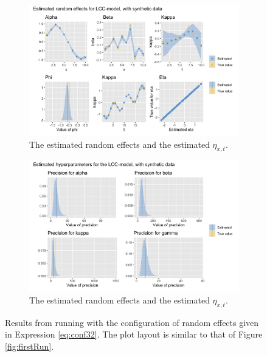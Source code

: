 \begin{figure}[h!]
    \centering
    \begin{subfigure}[b]{0.85\textwidth}
        \centering
        \includegraphics[width=\textwidth]{synthetic-data/Figures/effects-LCC-synthetic-3-2.png}
        \caption{The estimated random effects and the estimated $\eta_{x,t}$.}
    \end{subfigure}
    
    \begin{subfigure}[b]{0.6\textwidth}
        \centering
        \includegraphics[width=\textwidth]{synthetic-data/Figures/hyperparameters-LCC-synthetic-3-2.png}
        \caption{The estimated random effects and the estimated $\eta_{x,t}$.}
    \end{subfigure}
    \caption{Results from running \inlabru with the configuration of random effects given in Expression \ref{eq:conf32}. The plot layout is similar to that of Figure \ref{fig:firstRun}.}
    \label{fig:conf32}
\end{figure}
